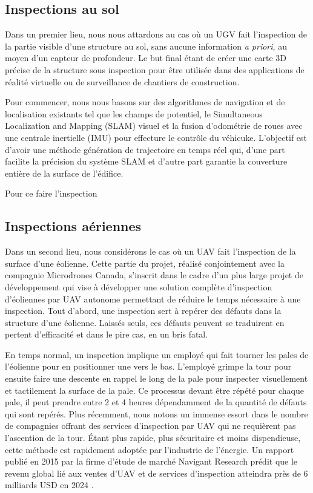 \subsection{Inspections au sol}
Dans un premier lieu, nous nous attardons au cas où un UGV fait l'inspection de la partie visible d'une structure au sol, sans aucune information \textit{a priori}, au moyen d'un capteur de profondeur. Le but final étant de créer une carte 3D précise de la structure sous inspection pour être utilisée dans des applications de réalité virtuelle ou de surveillance de chantiers de construction.


Pour commencer, nous nous basons sur des algorithmes de navigation et de localisation existants tel que les champs de potentiel, le Simultaneous Localization and Mapping (SLAM) visuel et la fusion d'odométrie de roues avec une centrale inertielle (IMU) pour effecture le contrôle du véhicuke. L'objectif est d'avoir une méthode génération de trajectoire en temps réel qui, d'une part facilite la précision du système SLAM et d'autre part garantie la couverture entière de la surface de l'édifice. 

Pour ce faire l'inspection 

\subsection{Inspections aériennes}
Dans un second lieu, nous considérons le cas où un UAV fait l'inspection de la surface d'une éolienne. Cette partie du projet, réalisé conjointement avec la compagnie Microdrones Canada, s'inscrit dans le cadre d'un plus large projet de développement qui vise à développer une solution complète d'inspection d'éoliennes par UAV autonome permettant de réduire le temps nécessaire à une inspection. Tout d'abord, une inspection sert à repérer des défauts dans la structure d'une éolienne. Laissés seuls, ces défauts peuvent se traduirent en pertent d'efficacité et dans le pire cas, en un bris fatal.

En temps normal, un inspection implique un employé qui fait tourner les pales de l'éolienne pour en positionner une vers le bas. L'employé grimpe la tour pour ensuite faire une descente en rappel le long de la pale pour inspecter visuellement et tactilement la surface de la pale. Ce processus devant être répété pour chaque pale, il peut prendre entre 2 et 4 heures dépendamment de la quantité de défauts qui sont repérés. Plus récemment, nous notons un immense essort dans le nombre de compagnies offrant des services d'inspection par UAV qui ne requièrent pas l'ascention de la tour. Étant plus rapide, plus sécuritaire et moins dispendieuse, cette méthode est rapidement adoptée par l'industrie de l'énergie. Un rapport publié en 2015 par la firme d'étude de marché Navigant Research prédit que le revenu global lié aux ventes d'UAV et de services d'inspection atteindra près de 6 milliards USD en 2024 \citep{navigant2015}.

